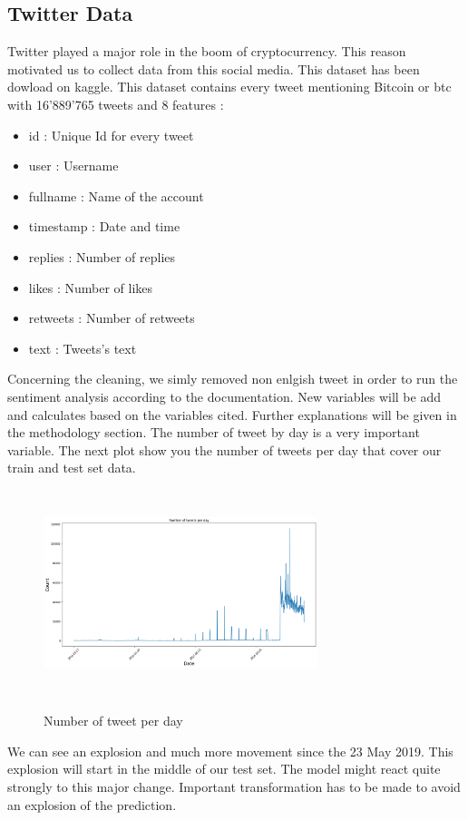 \documentclass[conference]{IEEEtran}
\begin{document}
\subsection{Twitter Data}\label{AA}
Twitter played a major role in the boom of cryptocurrency. This reason motivated us to collect data from this social media. This dataset has been dowload on kaggle. \cite{b5} This dataset contains every tweet mentioning Bitcoin or btc with 16'889'765 tweets and 8 features : \newline
\begin{itemize}
        \item id : Unique Id for every tweet
        \item user : Username
        \item fullname : Name of the account
        \item timestamp : Date and time
        \item replies : Number of replies
        \item likes : Number of likes
        \item retweets : Number of retweets      
        \item text : Tweets's text
\end{itemize}
\medskip
Concerning the cleaning, we simly removed non enlgish tweet in order to run the sentiment analysis according to the documentation.\cite{b6} New variables will be add and calculates based on the variables cited. Further explanations will be given in the methodology section. \newline
\newline The number of tweet by day is a very important variable. The next plot show you the number of tweets  per day that cover our train and test set data.\newline
\newline
\begin{figure}[H]
\includegraphics[width=8cm, height=6cm]{Tweet_count}
\label{fig}
\caption{Number of tweet per day}
\end{figure}
We can see an explosion and much more movement since the 23 May 2019. This explosion will start in the middle of our test set. The model might react quite strongly to this major change. Important transformation has to be made to avoid an explosion of the prediction. 
\end{document}
